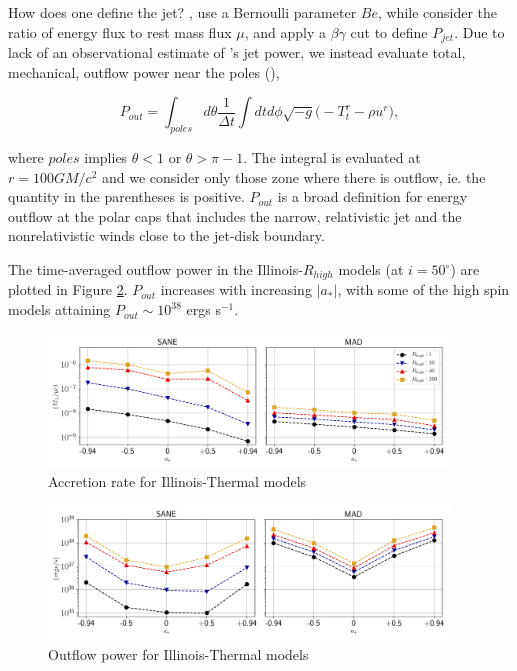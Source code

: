 How does one define the jet? \citet{refId0}, \citet{2014A&A...570A...7M} use a Bernoulli parameter $Be$, while \citealt{10.1111/j.1365-2966.2012.22002.x} consider the ratio of energy flux to rest mass flux $\mu$, and \citet{M87PaperV} apply a $\beta\gamma$ cut to define $P_{jet}$. Due to lack of an observational estimate of \sgra's jet power, we instead evaluate total, mechanical, outflow power near the poles (\cite{M87PaperV}),

\begin{equation}
    P_{out} = \int_{poles}d\theta\frac{1}{\Delta t}\int dtd\phi\sqrt{-g}\big(-T^{r}_{t}-\rho u^{r}\big),
\end{equation}

where $poles$ implies $\theta<1$ or $\theta>\pi-1$. The integral is evaluated at $r=100GM/c^{2}$ and we consider only those zone where there is outflow, ie. the quantity in the parentheses is positive. $P_{out}$ is a broad definition for energy outflow at the polar caps that includes the narrow, relativistic jet and the nonrelativistic winds close to the jet-disk boundary.

The time-averaged outflow power in the Illinois-$R_{high}$ models (at $i=50^{\circ}$) are plotted in Figure \ref{fig:outflow_illinois_thermal}. $P_{out}$ increases with increasing $|a_{*}|$, with some of the high spin models attaining $P_{out}\sim 10^{38}$ ergs s$^{-1}$. 

\begin{figure}
\centering
\includegraphics[width=0.95\textwidth]{figures/illinoisv3_average_mdot.png}
\caption{Accretion rate for Illinois-Thermal models}
\label{fig:accretion_illinois_thermal}
\end{figure}

\begin{figure}
\centering
\includegraphics[width=0.95\textwidth]{figures/illinoisv3_average_outflow_power.png}
\caption{Outflow power for Illinois-Thermal models}
\label{fig:outflow_illinois_thermal}
\end{figure}

